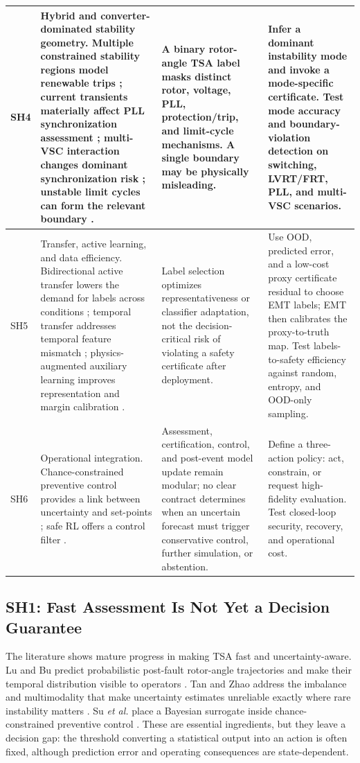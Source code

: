 \documentclass[conference]{IEEEtran}
\begin{document}
\begin{table}[t]
\begin{tabular}{p{} p{} p{} p{}}
\hline
SH4 & Hybrid and converter-dominated stability geometry. Multiple constrained stability regions model renewable trips \cite{mishra2019}; current transients materially affect PLL synchronization assessment \cite{chen2020}; multi-VSC interaction changes dominant synchronization risk \cite{wang2024}; unstable limit cycles can form the relevant boundary \cite{xu2025}. & A binary rotor-angle TSA label masks distinct rotor, voltage, PLL, protection/trip, and limit-cycle mechanisms. A single boundary may be physically misleading. & Infer a dominant instability mode and invoke a mode-specific certificate. Test mode accuracy and boundary-violation detection on switching, LVRT/FRT, PLL, and multi-VSC scenarios.\\
\hline
SH5 & Transfer, active learning, and data efficiency. Bidirectional active transfer lowers the demand for labels across conditions \cite{shi2023}; temporal transfer addresses temporal feature mismatch \cite{liu2025}; physics-augmented auxiliary learning improves representation and margin calibration \cite{shen2025}. & Label selection optimizes representativeness or classifier adaptation, not the decision-critical risk of violating a safety certificate after deployment. & Use OOD, predicted error, and a low-cost proxy certificate residual to choose EMT labels; EMT then calibrates the proxy-to-truth map. Test labels-to-safety efficiency against random, entropy, and OOD-only sampling.\\
\hline
SH6 & Operational integration. Chance-constrained preventive control provides a link between uncertainty and set-points \cite{su2024}; safe RL offers a control filter \cite{zhao2023}. & Assessment, certification, control, and post-event model update remain modular; no clear contract determines when an uncertain forecast must trigger conservative control, further simulation, or abstention. & Define a three-action policy: act, constrain, or request high-fidelity evaluation. Test closed-loop security, recovery, and operational cost.\\
\hline
\end{tabular}
\end{table}

\subsection{SH1: Fast Assessment Is Not Yet a Decision Guarantee}

The literature shows mature progress in making TSA fast and uncertainty-aware. Lu and Bu predict probabilistic post-fault rotor-angle trajectories and make their temporal distribution visible to operators \cite{lu2025}. Tan and Zhao address the imbalance and multimodality that make uncertainty estimates unreliable exactly where rare instability matters \cite{tan2023}. Su \emph{et al.} place a Bayesian surrogate inside chance-constrained preventive control \cite{su2024}. These are essential ingredients, but they leave a decision gap: the threshold converting a statistical output into an action is often fixed, although prediction error and operating consequences are state-dependent.
\end{document}
